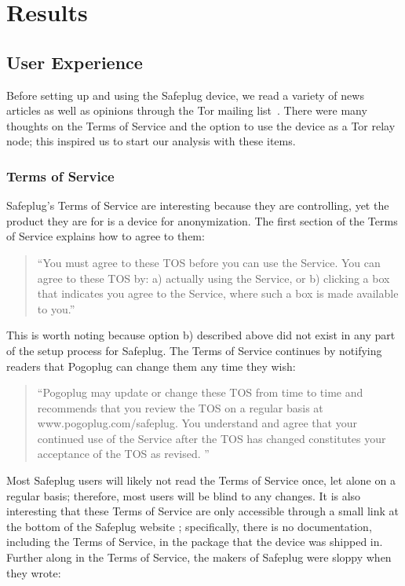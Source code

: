 \section{Results}
\label{sec:results}
\subsection{User Experience}
\label{sec:ux}

Before setting up and using the Safeplug device, we read a variety of news articles as well as opinions through the Tor mailing list~\cite{tormailinglist}.  There were many thoughts on the Terms of Service and the option to use the device as a Tor relay node; this inspired us to start our analysis with these items.  

\subsubsection{Terms of Service}
\label{tos}
Safeplug's Terms of Service are interesting because they are controlling, yet the product they are for is a device for anonymization.  The first section of the Terms of Service explains how to agree to them:

\begin{quotation}
``You must agree to these TOS before you can use the Service. You can agree to these TOS by: a) actually using the Service, or b) clicking a box that indicates you agree to the Service, where such a box is made available to you.'' \cite{safeplug}
\end{quotation}

This is worth noting because option b) described above did not exist in any part of the setup process for Safeplug.  The Terms of Service continues by notifying readers that Pogoplug can change them any time they wish:

\begin{quotation}
``Pogoplug may update or change these TOS from time to time and recommends that you review the TOS on a regular basis at www.pogoplug.com/safeplug. You understand and agree that your continued use of the Service after the TOS has changed constitutes your acceptance of the TOS as revised. '' \cite{safeplug}
\end{quotation}

Most Safeplug users will likely not read the Terms of Service once, let alone on a regular basis; therefore, most users will be blind to any changes.  It is also interesting that these Terms of Service are only accessible through a small link at the bottom of the Safeplug website \cite{safeplug}; specifically, there is no documentation, including the Terms of Service, in the package that the device was shipped in.  Further along in the Terms of Service, the makers of Safeplug were sloppy when they wrote:

